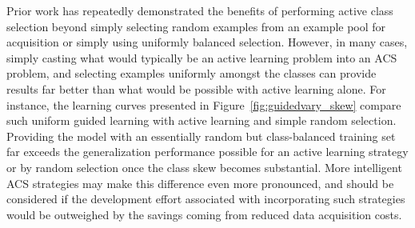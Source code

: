 Prior work has repeatedly demonstrated the benefits of performing active class selection beyond simply selecting random examples from an example pool for acquisition or simply using uniformly balanced selection. However, in many cases, simply casting what would typically be an active learning problem into an ACS problem, and selecting examples uniformly amongst the classes can provide results far better than what would be possible with active learning alone. For instance, the learning curves presented in Figure~\ref{fig:guidedvary_skew} compare such uniform guided learning with active learning and simple random selection. Providing the model with an essentially random but class-balanced training set far exceeds the generalization performance possible for an active learning strategy or by random selection once the class skew becomes substantial. More intelligent ACS strategies may make this difference even more pronounced, and should be considered if the development effort associated with incorporating such strategies would be outweighed by the savings coming from reduced data acquisition costs.

